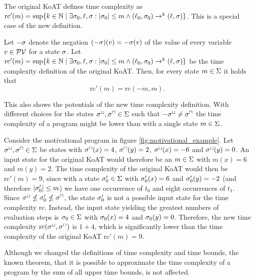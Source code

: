 The original KoAT defines time complexity as $\text{rc}'(m) = \sup \lbrace  k \in \mathbb{N} \mid \exists \sigma_0, \ell, \sigma: \left|\sigma_0\right| \leq m \wedge (\ell_0, \sigma_0) \rightarrow^k (\ell, \sigma)  \rbrace$.
This is a special case of the new definition.

\begin{remark}
  Let $-\sigma$ denote the negation $(-\sigma)(v) = -\sigma(v)$ of the value of every variable $v \in \mathcal{PV}$ for a state $\sigma$.
  Let $\text{rc}'(m) = \sup \lbrace  k \in \mathbb{N} \mid \exists \sigma_0, \ell, \sigma: \left|\sigma_0\right| \leq m \wedge (\ell_0, \sigma_0) \rightarrow^k (\ell, \sigma)  \rbrace$ be the time complexity definition of the original KoAT.
  Then, for every state $m \in \Sigma$ it holds that
  \[ \text{rc}'(m) = \text{rc}(-m,m). \]
\end{remark}

This also shows the potentials of the new time complexity definition.
With different choices for the states ${\sigma^\sqcup}, {\sigma^\sqcap} \in \Sigma$ such that $-{\sigma^\sqcup} \neq {\sigma^\sqcap}$ the time complexity of a program might be lower than with a single state $m \in \Sigma$.

Consider the motivational program in figure \ref{fig:motivational_example}.
Let ${\sigma^\sqcup}, {\sigma^\sqcap} \in \Sigma$ be states with ${\sigma^\sqcap}(x) = 4$, ${\sigma^\sqcap}(y) = 2$, ${\sigma^\sqcup}(x) = -6$ and ${\sigma^\sqcup}(y) = 0$.
An input state for the original KoAT would therefore be an $m \in \Sigma$ with $m(x) = 6$ and $m(y) = 2$.
The time complexity of the original KoAT would then be $\text{rc}'(m) = 9$, since with a state $\sigma'_0 \in \Sigma$ with $\sigma'_0(x) = 6$ and $\sigma'_0(y) = -2$ (and therefore $\left|\sigma'_0\right| \leq m$) we have one occurrence of $t_0$ and eight occurrences of $t_1$.
Since ${\sigma^\sqcup} \nleq \sigma'_0 \nleq {\sigma^\sqcap}$, the state $\sigma'_0$ is not a possible input state for the time complexity $\text{rc}$.
Instead, the input state yielding the greatest numbers of evaluation steps is $\sigma_0 \in \Sigma$ with $\sigma_0(x) = 4$ and $\sigma_0(y) = 0$.
Therefore, the new time complexity $\text{rc}({\sigma^\sqcup}, {\sigma^\sqcap})$ is $1 + 4$, which is significantly lower than the time complexity of the original KoAT $\text{rc}'(m) = 9$.

Although we changed the definitions of time complexity and time bounds, the known theorem, that it is possible to approximate the time complexity of a program by the sum of all upper time bounds, is not affected.


